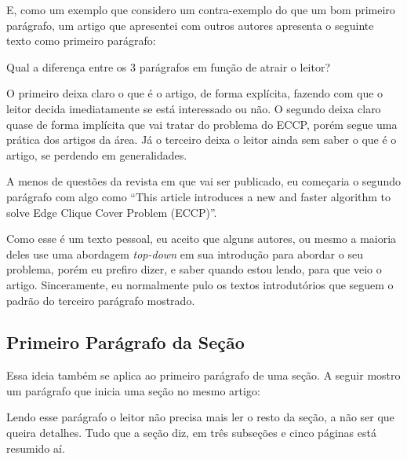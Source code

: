 \documentclass{article}
\begin{document}
E, como um exemplo que considero um contra-exemplo do que um bom primeiro parágrafo, um artigo que apresentei com outros autores apresenta o seguinte texto como primeiro parágrafo:


Qual a diferença entre os 3 parágrafos em função de atrair o leitor?

O primeiro deixa claro o que é o artigo, de forma explícita, fazendo com que o leitor decida imediatamente se está interessado ou não. O segundo deixa claro quase de forma implícita que vai tratar do problema do ECCP, porém segue uma prática dos artigos da área. Já o terceiro deixa o leitor ainda sem saber o que é o artigo, se perdendo em generalidades.

A menos de questões da revista em que vai ser publicado, eu começaria o segundo parágrafo com algo como \enquote{This article introduces a new and faster algorithm to solve Edge Clique Cover Problem (ECCP)}.

Como esse é um texto pessoal, eu aceito que alguns autores, ou mesmo a maioria deles use uma abordagem \textit{top-down} em sua introdução para abordar o seu problema, porém eu prefiro dizer, e saber quando estou lendo, para que veio o artigo. Sinceramente, eu normalmente pulo os textos introdutórios que seguem o padrão do terceiro parágrafo mostrado.

\subsection{Primeiro Parágrafo da Seção}

Essa ideia também se aplica ao primeiro parágrafo de uma seção. A seguir mostro um parágrafo que inicia uma seção no mesmo artigo:


Lendo esse parágrafo o leitor não precisa mais ler o resto da seção, a não ser que queira detalhes. Tudo que a seção diz, em três subseções e cinco páginas está resumido aí. 
\end{document}

